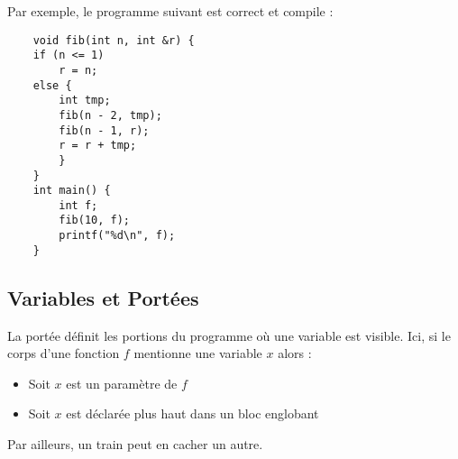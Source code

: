 \documentclass{cours}
\begin{document}
Par exemple, le programme suivant est correct et compile :
\begin{verbatim}
    void fib(int n, int &r) {
    if (n <= 1)
        r = n;
    else {
        int tmp;
        fib(n - 2, tmp);
        fib(n - 1, r);
        r = r + tmp;
        }
    }
    int main() {
        int f;
        fib(10, f);
        printf("%d\n", f);
    }
\end{verbatim}


\subsection{Variables et Portées}
\begin{definition}
    La portée définit les portions du programme où une variable est visible. Ici, si le corps d'une fonction $f$ mentionne une variable $x$ alors :
    \begin{itemize}
        \item Soit $x$ est un paramètre de $f$
        \item Soit $x$ est déclarée plus haut dans un bloc englobant
    \end{itemize}
    Par ailleurs, un train peut en cacher un autre.
\end{definition}
\end{document}
